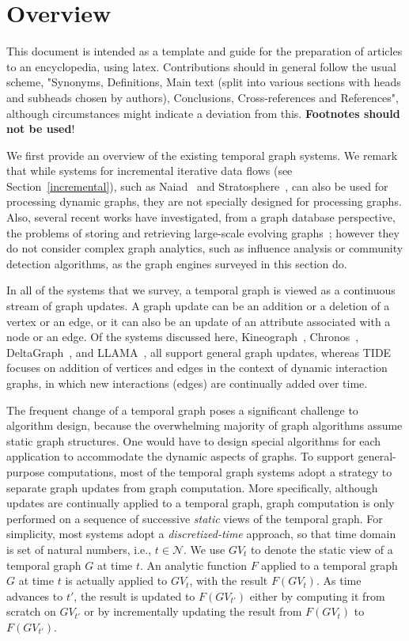 \documentclass{svjour3}
\begin{document}
\section{Overview}
This document is intended as a template and guide for the preparation of articles to an encyclopedia, using latex. Contributions should in general follow the usual scheme, "Synonyms, Definitions, Main text (split into various sections with heads and subheads chosen by authors), Conclusions, Cross-references and References", although circumstances might indicate a deviation from this. 
{\bf Footnotes should not be used}!


We first provide an overview of the existing temporal graph systems. We remark that while systems for incremental iterative data flows (see Section~\ref{incremental}), such as Naiad~\cite{naiad} and Stratosphere~\cite{stratosphere}, can also be used for processing dynamic graphs, they are not specially
designed for processing graphs. Also, several recent works have investigated, from a graph database perspective, the problems of storing and retrieving large-scale evolving graphs~\cite{Mondal2012,RenLKZC11:QueryEvolveGraph}; however they do not consider complex graph analytics, such as influence analysis or community detection algorithms, as the graph engines surveyed in this section do.

\vspace{2mm}

 In all of the systems that we survey, a temporal graph is viewed as a continuous stream of graph updates. A graph update can be an addition or a deletion of a vertex or an edge, or it can also be an update of an attribute associated with a node or an edge. Of the systems discussed here, Kineograph~\cite{kineograph}, Chronos~\cite{chronos}, DeltaGraph~\cite{KhuranaD13:HistoricGraph}, and LLAMA~\cite{llama}, all support general graph updates, whereas TIDE~\cite{tide} focuses on addition of vertices and edges in the context of dynamic interaction graphs, in which new interactions (edges) are continually added over time.

The frequent change of a temporal graph poses a significant challenge to algorithm design, because the overwhelming majority of graph algorithms assume static graph structures. One would have to design special algorithms for each application to accommodate the dynamic aspects of graphs. To support general-purpose computations, most of the temporal graph systems adopt a strategy to separate graph updates from graph computation. More specifically, although updates are continually applied to a temporal graph, graph computation is only performed on a sequence of successive \emph{static} views of the temporal graph. For simplicity, most systems adopt a \emph{discretized-time} approach, so that time domain is set of natural numbers, i.e., $t\in \mathcal{N}$. We use $GV_t$ to denote the static view of a temporal graph $G$ at time $t$. An analytic function $F$ applied to a temporal graph $G$ at time $t$ is actually applied to $GV_t$, with the result $F(GV_{t})$. As time advances to $t'$, the result is updated to $F(GV_{t'})$ either by computing it from scratch on $GV_{t'}$ or by incrementally updating the result from $F(GV_{t})$ to $F(GV_{t'})$.
\end{document}
